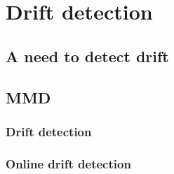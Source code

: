 \section{Drift detection}
    \subsection{A need to detect drift}
    \subsection{MMD}
        \subsubsection{Drift detection}
            
        \subsubsection{Online drift detection}
            